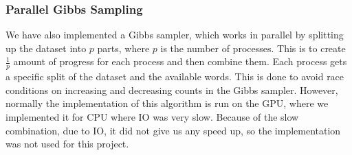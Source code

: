 \subsubsection*{Parallel Gibbs Sampling}\label{sec:appendix_para_gibbs}
We have also implemented a Gibbs sampler, which works in parallel by splitting up the dataset into $p$ parts, where $p$ is the number of processes.
This is to create $\frac{1}{p}$ amount of progress for each process and then combine them.
Each process gets a specific split of the dataset and the available words. 
This is done to avoid race conditions on increasing and decreasing counts in the Gibbs sampler.
However, normally the implementation of this algorithm is run on the GPU, where we implemented it for CPU where IO was very slow.
Because of the slow combination, due to IO, it did not give us any speed up, so the implementation was not used for this project. 
